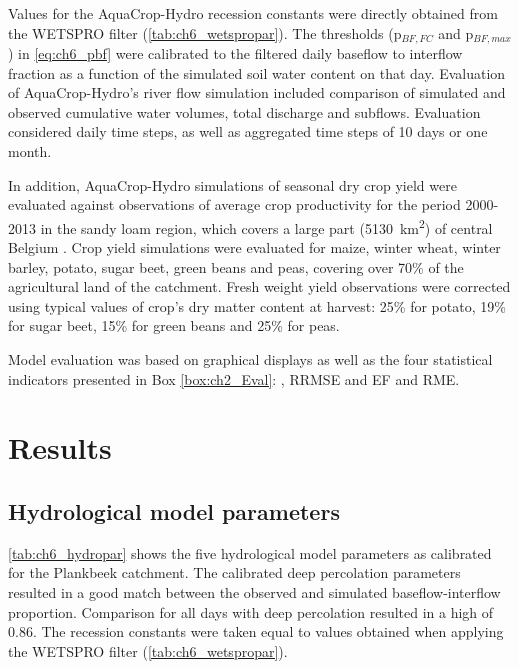 Values for the AquaCrop-Hydro recession constants were directly obtained from the WETSPRO filter (\autoref{tab:ch6_wetspropar}). The \pbf thresholds (p$_{BF,FC}$ and p$_{BF,max}$) in \autoref{eq:ch6_pbf} were calibrated to the filtered daily baseflow to interflow fraction as a function of the simulated soil water content on that day. Evaluation of AquaCrop-Hydro's river flow simulation included comparison of simulated and observed cumulative water volumes, total discharge and subflows. Evaluation considered daily time steps, as well as aggregated time steps of 10 days or one month. 

In addition, AquaCrop-Hydro simulations of seasonal dry crop yield were evaluated against observations of average crop productivity for the period 2000-2013 in the sandy loam region, which covers a large part (\SI{5130}{km^2}) of central Belgium \parencite{fodeconomie2014}. Crop yield simulations were evaluated for maize, winter wheat, winter barley, potato, sugar beet, green beans and peas, covering over 70\% of the agricultural land of the catchment. Fresh weight yield observations were corrected using typical values of crop's dry matter content at harvest: 25\% for potato, 19\% for sugar beet, 15\% for green beans and 25\% for peas.

Model evaluation was based on graphical displays as well as the four statistical indicators presented in Box \ref{box:ch2_Eval}: \Rsq, RRMSE and EF and RME. 

\section{Results}
\subsection{Hydrological model parameters}
\autoref{tab:ch6_hydropar} shows the five hydrological model parameters as calibrated for the Plankbeek catchment. The calibrated deep percolation parameters resulted in a good match between the observed and simulated baseflow-interflow proportion. Comparison for all days with deep percolation resulted in a high \Rsq of 0.86. The recession constants were taken equal to values obtained when applying the WETSPRO filter (\autoref{tab:ch6_wetspropar}).

